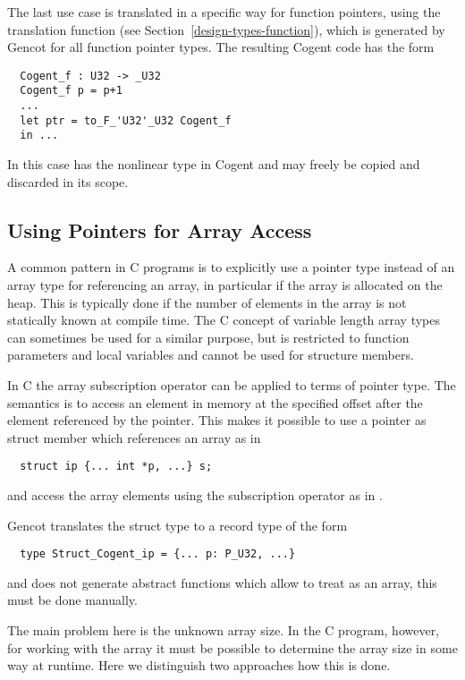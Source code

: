 The last use case is translated in a specific way for function pointers, using the translation function
 (see Section~\ref{design-types-function}), which is generated by Gencot for all function
pointer types. The resulting Cogent code has the form
\begin{verbatim}
  Cogent_f : U32 -> _U32
  Cogent_f p = p+1
  ...
  let ptr = to_F_'U32'_U32 Cogent_f
  in ...
\end{verbatim}
In this case  has the nonlinear type  in Cogent and may freely be copied and
discarded in its scope.

\subsection{Using Pointers for Array Access}
\label{app-trans-arrpoint}

A common pattern in C programs is to explicitly use a pointer type instead of an array type for referencing an array,
in particular if the array is allocated on the heap. This is typically done if the number of elements in the
array is not statically known at compile time. The C concept of variable length array types can sometimes be
used for a similar purpose, but is restricted to function parameters and local variables and cannot be used for
structure members.

In C the array subscription operator can be applied to terms of pointer type. The semantics is to access an element 
in memory at the specified offset after the element referenced by the pointer. This makes it possible to use 
a pointer as struct member which references an array as in
\begin{verbatim}
  struct ip {... int *p, ...} s;
\end{verbatim}
and access the array elements using the subscription operator as in .

Gencot translates the struct type to a record type of the form
\begin{verbatim}
  type Struct_Cogent_ip = {... p: P_U32, ...}
\end{verbatim}
and does not generate abstract functions which allow to treat  as an array, this must be done manually.

The main problem here is the unknown array size. In the C program, however, for working with the array it must be
possible to determine the array size in some way at runtime. Here we distinguish two approaches how this is done.


